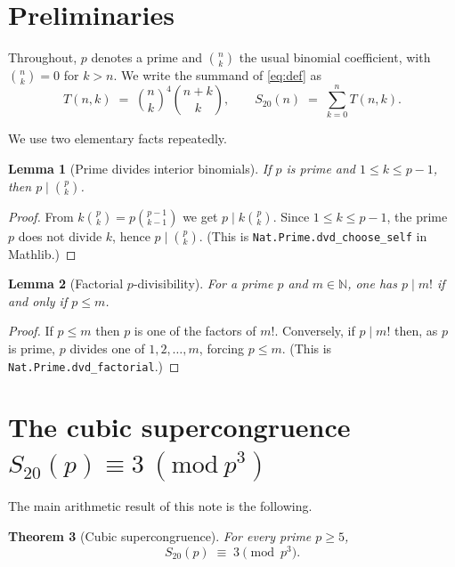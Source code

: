 \documentclass[11pt,a4paper]{article}
\newtheorem{theorem}{Theorem}[section]
\newtheorem{lemma}[theorem]{Lemma}
\theoremstyle{definition}
\theoremstyle{remark}
\newcommand{\Sx}{S_{20}}
\begin{document}
\section{Preliminaries}\label{sec:prelim}

Throughout, $p$ denotes a prime and $\binom{n}{k}$ the usual binomial
coefficient, with $\binom{n}{k}=0$ for $k>n$.  We write the summand of
\eqref{eq:def} as
\[
  T(n,k) \;=\; \binom{n}{k}^{4}\binom{n+k}{k}, \qquad
  \Sx(n) \;=\; \sum_{k=0}^{n} T(n,k).
\]

We use two elementary facts repeatedly.

\begin{lemma}[Prime divides interior binomials]\label{lem:dvdchoose}
If $p$ is prime and $1\le k\le p-1$, then $p \mid \binom{p}{k}$.
\end{lemma}

\begin{proof}
From $k\binom{p}{k}=p\binom{p-1}{k-1}$ we get $p \mid k\binom{p}{k}$.  Since
$1\le k\le p-1$, the prime $p$ does not divide $k$, hence $p\mid\binom{p}{k}$.
(This is \texttt{Nat.Prime.dvd\_choose\_self} in Mathlib.)
\end{proof}

\begin{lemma}[Factorial $p$-divisibility]\label{lem:dvdfact}
For a prime $p$ and $m\in\mathbb N$, one has $p \mid m!$ if and only if
$p\le m$.
\end{lemma}

\begin{proof}
If $p\le m$ then $p$ is one of the factors of $m!$.  Conversely, if $p\mid m!$
then, as $p$ is prime, $p$ divides one of $1,2,\dots,m$, forcing $p\le m$.
(This is \texttt{Nat.Prime.dvd\_factorial}.)
\end{proof}

\section{The cubic supercongruence $\Sx(p)\equiv 3\ (\mathrm{mod}\ p^3)$}
\label{sec:cubic}

The main arithmetic result of this note is the following.

\begin{theorem}[Cubic supercongruence]\label{thm:cubic}
For every prime $p\ge 5$,
\[
  \Sx(p)\;\equiv\;3 \pmod{p^{3}}.
\]
\end{theorem}
\end{document}
